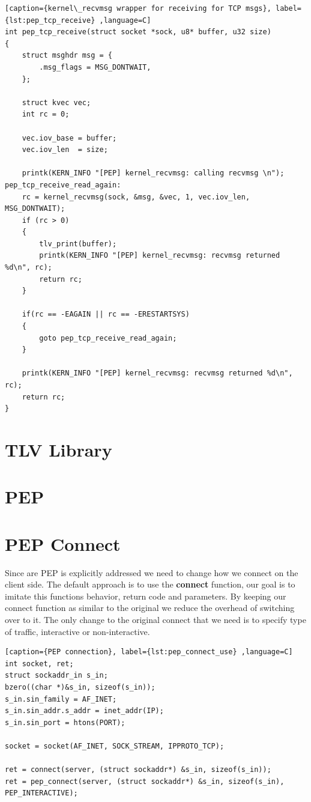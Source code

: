 \documentclass[a4paper,english, 11pt]{report}
\begin{document}
\begin{lstlisting}[caption={kernel\_recvmsg wrapper for receiving for TCP msgs}, label={lst:pep_tcp_receive} ,language=C]
int pep_tcp_receive(struct socket *sock, u8* buffer, u32 size)
{
	struct msghdr msg = {
		.msg_flags = MSG_DONTWAIT,
	};

	struct kvec vec;
	int rc = 0;

	vec.iov_base = buffer;
	vec.iov_len  = size;

	printk(KERN_INFO "[PEP] kernel_recvmsg: calling recvmsg \n");
pep_tcp_receive_read_again:
	rc = kernel_recvmsg(sock, &msg, &vec, 1, vec.iov_len, MSG_DONTWAIT);
	if (rc > 0)
	{
		tlv_print(buffer);
		printk(KERN_INFO "[PEP] kernel_recvmsg: recvmsg returned %d\n", rc);
		return rc;
	}

	if(rc == -EAGAIN || rc == -ERESTARTSYS)
	{
		goto pep_tcp_receive_read_again;
	}

	printk(KERN_INFO "[PEP] kernel_recvmsg: recvmsg returned %d\n", rc);
	return rc;
}
\end{lstlisting}

\section{TLV Library}

\section{PEP}

\section{PEP Connect}
Since are PEP is explicitly addressed we need to change how we connect on the client side.
The default approach is to use the \textbf{connect} function, our goal is to imitate this functions behavior, return code and parameters. By keeping our connect function as similar to the original we reduce the overhead of switching over to it. The only change to the original connect that we need is to specify type of traffic, interactive or non-interactive.
\begin{lstlisting}[caption={PEP connection}, label={lst:pep_connect_use} ,language=C]
int socket, ret;
struct sockaddr_in s_in;
bzero((char *)&s_in, sizeof(s_in));
s_in.sin_family = AF_INET;
s_in.sin_addr.s_addr = inet_addr(IP);
s_in.sin_port = htons(PORT);

socket = socket(AF_INET, SOCK_STREAM, IPPROTO_TCP);

ret = connect(server, (struct sockaddr*) &s_in, sizeof(s_in));
ret = pep_connect(server, (struct sockaddr*) &s_in, sizeof(s_in), PEP_INTERACTIVE);
\end{lstlisting}
\end{document}

